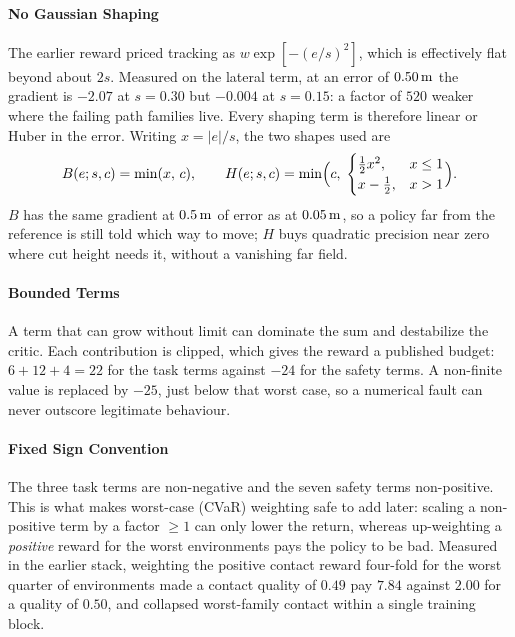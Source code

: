 \paragraph{No Gaussian Shaping}
The earlier reward priced tracking as $w\exp[-(e/s)^2]$, which is effectively
flat beyond about $2s$. Measured on the lateral term, at an error of
$\unit[0.50]{m}$ the gradient is $-2.07$ at $s=0.30$ but $-0.004$ at $s=0.15$:
a factor of $520$ weaker where the failing path families live. Every
shaping term is therefore linear or Huber in the error. Writing $x = |e|/s$,
the two shapes used are
%
\begin{equation}
  \label{eq:ctrl:shapes}
  B(e;s,c) = \min(x,\,c),
  \qquad
  H(e;s,c) = \min\Bigl(c,\;
  \begin{cases}
    \tfrac{1}{2}x^{2}, & x \le 1\\
    x - \tfrac{1}{2},  & x > 1
  \end{cases}\Bigr).
\end{equation}
%
$B$ has the same gradient at $\unit[0.5]{m}$ of error as at $\unit[0.05]{m}$,
so a policy far from the reference is still told which way to move; $H$ buys
quadratic precision near zero where cut height needs it, without a vanishing
far field.

\paragraph{Bounded Terms}
A term that can grow without limit can dominate the sum and destabilize the
critic. Each contribution is clipped, which gives the reward a published budget:
$6+12+4 = 22$ for the task terms against $-24$ for the safety terms. A
non-finite value is replaced by $-25$, just below that worst case, so a
numerical fault can never outscore legitimate behaviour.

\paragraph{Fixed Sign Convention}
The three task terms are non-negative and the seven safety terms non-positive.
This is what makes worst-case (CVaR) weighting safe to add later: scaling a
non-positive term by a factor $\ge 1$ can only lower the return, whereas
up-weighting a \emph{positive} reward for the worst environments pays the
policy to be bad. Measured in the earlier stack, weighting the positive contact
reward four-fold for the worst quarter of environments made a contact quality
of $0.49$ pay $7.84$ against $2.00$ for a quality of $0.50$, and collapsed
worst-family contact within a single training block.

